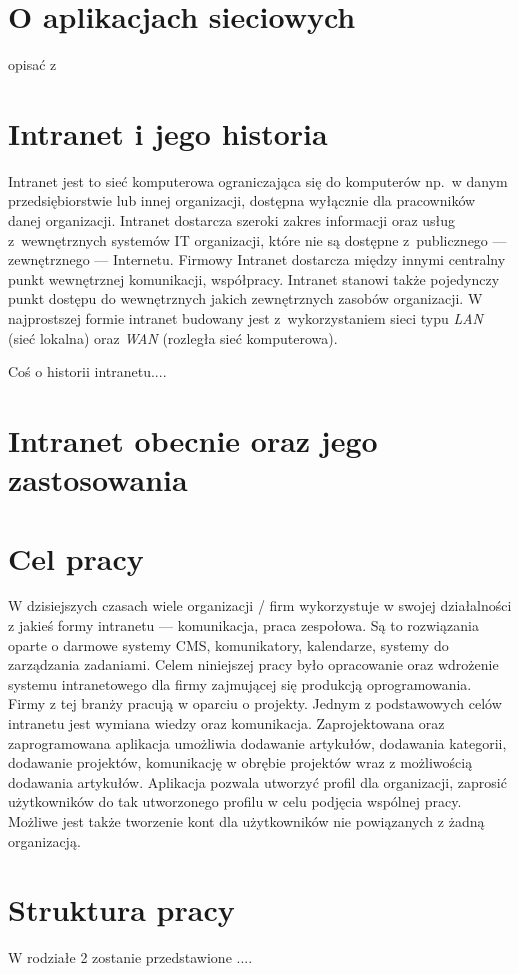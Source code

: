 \section{O aplikacjach sieciowych}
opisać z \cite{strack15}
\section{Intranet i jego historia}

Intranet jest to sieć komputerowa ograniczająca się do komputerów np.\ w danym przedsiębiorstwie lub innej organizacji, dostępna wyłącznie dla
pracowników danej organizacji. Intranet dostarcza szeroki zakres informacji oraz usług z~wewnętrznych systemów IT organizacji, które nie są
dostępne z~publicznego --- zewnętrznego --- Internetu. Firmowy Intranet dostarcza między innymi centralny punkt wewnętrznej komunikacji, współpracy. 
Intranet stanowi także pojedynczy punkt dostępu do wewnętrznych jakich zewnętrznych zasobów organizacji. W najprostszej formie intranet budowany
jest z~wykorzystaniem sieci typu \emph{LAN} (sieć lokalna) oraz \emph{WAN} (rozległa sieć komputerowa)\cite{intranetWiki}.

Coś o historii intranetu....

\section{Intranet obecnie oraz jego zastosowania}


\section{Cel pracy}

W dzisiejszych czasach wiele organizacji / firm wykorzystuje w swojej działalności z jakieś formy intranetu --- komunikacja, praca zespołowa. 
Są to rozwiązania oparte o darmowe systemy CMS, komunikatory, kalendarze, systemy do zarządzania zadaniami. Celem niniejszej pracy było opracowanie
oraz wdrożenie systemu intranetowego dla firmy zajmującej się produkcją oprogramowania. Firmy z tej branży pracują w oparciu o projekty. Jednym z
podstawowych celów intranetu jest wymiana wiedzy oraz komunikacja. Zaprojektowana oraz zaprogramowana aplikacja umożliwia dodawanie artykułów,
dodawania kategorii, dodawanie projektów, komunikację w obrębie projektów wraz z możliwością dodawania artykułów. Aplikacja pozwala utworzyć profil 
dla organizacji, zaprosić użytkowników do tak utworzonego profilu w celu podjęcia wspólnej pracy. Możliwe jest także tworzenie kont dla użytkowników
nie powiązanych z żadną organizacją.

\section{Struktura pracy}
W rodziałe 2 zostanie przedstawione ....

